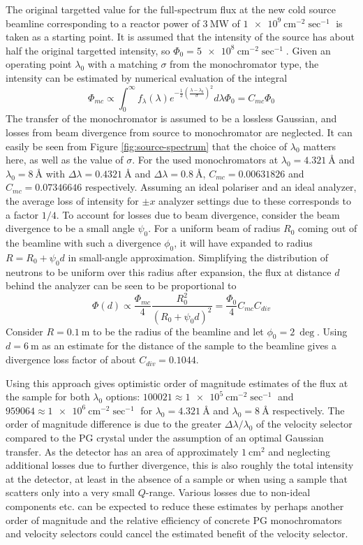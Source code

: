The original targetted value for the full-spectrum flux at the new cold source beamline corresponding to a reactor power of $\SI{3}{\mega\watt}$ of $\SI{1e9}{\centi\meter^{-2}\sec^{-1}}$ \cite{OYSTER2008} is taken as a starting point. It is assumed that the intensity of the source has about half the original targetted intensity, so $\Phi_0 = \SI{5e8}{\centi\meter^{-2}\sec^{-1}}$. Given an operating point $\lambda_0$ with a matching $\sigma$ from the monochromator type, the intensity can be estimated by numerical evaluation of the integral
$$\Phi_{mc} \propto \int_0^\infty f_\lambda(\lambda)e^{-\frac{1}{2}\left(\frac{\lambda - \lambda_0}{\sigma}\right)^2}d\lambda \Phi_0= C_{mc}\Phi_0$$
The transfer of the monochromator is assumed to be a lossless Gaussian, and losses from beam divergence from source to monochromator are neglected.  It can easily be seen from Figure \ref{fig:source-spectrum} that the choice of $\lambda_0$ matters here, as well as the value of $\sigma$. For the used monochromators at $\lambda_0 = \SI{4.321}{\angstrom}$ and $\lambda_0 = \SI{8}{\angstrom}$ with $\Delta\lambda = \SI{0.4321}{\angstrom}$ and $\Delta\lambda = \SI{0.8}{\angstrom}$, $C_{mc} = 0.00631826$ and $C_{mc} = 0.07346646$ respectively. Assuming an ideal polariser and an ideal analyzer, the average loss of intensity for $\pm x$ analyzer settings due to these corresponds to a factor $1/4$. To account for losses due to beam divergence, consider the beam divergence to be a small angle $\psi_0$. 
For a uniform beam of radius $R_0$ coming out of the beamline with such a divergence $\phi_0$, it will have expanded to radius $R = R_0 + \psi_0 d$ in small-angle approximation. Simplifying the distribution of neutrons to be uniform over this radius after expansion, the flux at distance $d$ behind the analyzer can be seen to be proportional to
$$\Phi(d) \propto \frac{\Phi_{mc}}{4}\frac{R_0^2}{(R_0 + \psi_0 d)^2} = \frac{\Phi_0}{4}C_{mc}C_{div}$$
Consider $R = \SI{0.1}{\meter}$ to be the radius of the beamline and let $\phi_0 = \SI{2}{\deg}$. Using $d = \SI{6}{\meter}$ as an estimate for the distance of the sample to the beamline gives a divergence loss factor of about $C_{div} = 0.1044$.

Using this approach gives optimistic order of magnitude estimates of the flux at the sample for both $\lambda_0$ options: $100021 \approx \SI{1e5}{\centi\meter^{-2}\sec^{-1}}$ and $959064 \approx \SI{1e6}{\centi\meter^{-2}\sec^{-1}}$ for $\lambda_0 = \SI{4.321}{\angstrom}$ and $\lambda_0 = \SI{8}{\angstrom}$ respectively. The order of magnitude difference is due to the greater $\Delta\lambda/\lambda_0$ of the velocity selector compared to the PG crystal under the assumption of an optimal Gaussian transfer. As the detector has an area of approximately $\SI{1}{\centi\meter^2}$ and neglecting additional losses due to further divergence, this is also roughly the total intensity at the detector, at least in the absence of a sample or when using a sample that scatters only into a very small $Q$-range. Various losses due to non-ideal components etc. can be expected to reduce these estimates by perhaps another order of magnitude and the relative efficiency of concrete PG monochromators and velocity selectors could cancel the estimated benefit of the velocity selector.

